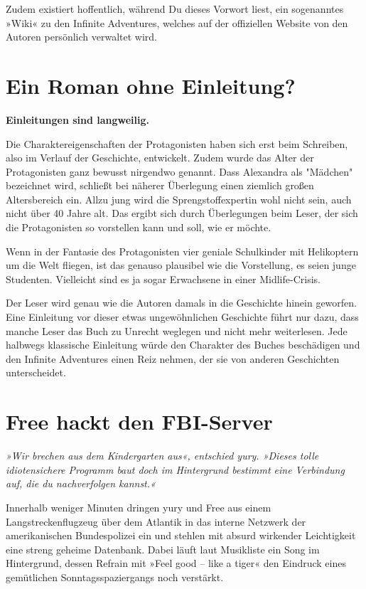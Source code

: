 Zudem existiert hoffentlich, während Du dieses Vorwort liest, ein sogenanntes »Wiki« zu den Infinite Adventures, welches auf der offiziellen Website von den Autoren persönlich verwaltet wird.


\chapter{Ein Roman ohne Einleitung?}

\begin{center}
    \textbf{Einleitungen sind langweilig.}
\end{center}

Die Charaktereigenschaften der Protagonisten haben sich erst beim Schreiben, also im Verlauf der Geschichte, entwickelt. Zudem wurde das Alter der Protagonisten ganz bewusst nirgendwo genannt. Dass Alexandra als "Mädchen" bezeichnet wird, schließt bei näherer Überlegung einen ziemlich großen Altersbereich ein. Allzu jung wird die Sprengstoffexpertin wohl nicht sein, auch nicht über 40 Jahre alt. Das ergibt sich durch Überlegungen beim Leser, der sich die Protagonisten so vorstellen kann und soll, wie er möchte. 

Wenn in der Fantasie des Protagonisten vier geniale Schulkinder mit Helikoptern um die Welt fliegen, ist das genauso plausibel wie die Vorstellung, es seien junge Studenten. Vielleicht sind es ja sogar Erwachsene in einer Midlife-Crisis.

Der Leser wird genau wie die Autoren damals in die Geschichte hinein geworfen. Eine Einleitung vor dieser etwas ungewöhnlichen Geschichte führt nur dazu, dass manche Leser das Buch zu Unrecht weglegen und nicht mehr weiterlesen. Jede halbwegs klassische Einleitung würde den Charakter des Buches beschädigen und den Infinite Adventures einen Reiz nehmen, der sie von anderen Geschichten unterscheidet.


\chapter{Free hackt den FBI-Server}

\textit{»Wir brechen aus dem Kindergarten aus«, entschied yury. »Dieses tolle idiotensichere Programm baut doch im Hintergrund bestimmt eine Verbindung auf, die du nachverfolgen kannst.«}

\bigskip

Innerhalb weniger Minuten dringen yury und Free aus einem Langstreckenflugzeug über dem Atlantik in das interne Netzwerk der amerikanischen Bundespolizei ein und stehlen mit absurd wirkender Leichtigkeit eine streng geheime Datenbank. Dabei läuft laut Musikliste ein Song im Hintergrund, dessen Refrain mit »Feel good – like a tiger« den Eindruck eines gemütlichen Sonntagsspaziergangs noch verstärkt.

